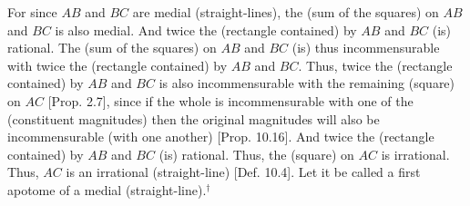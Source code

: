 \begin{Parallel}{}{}
{For since $AB$ and $BC$ are medial (straight-lines), the (sum of the squares)
on $AB$ and $BC$ is also medial. And twice the (rectangle contained)
by $AB$ and $BC$ (is) rational. The (sum of the squares) on $AB$
and $BC$ (is) thus incommensurable with twice the (rectangle contained)
by $AB$ and $BC$. Thus, twice the (rectangle contained) by
$AB$ and $BC$ is also incommensurable with the remaining (square) on $AC$ [Prop. 2.7], since  if the whole is
incommensurable with one of the (constituent magnitudes)   then the original magnitudes will also be incommensurable (with one another) [Prop. 10.16]. And twice the (rectangle
contained) by $AB$ and $BC$ (is) rational. Thus, the (square) on $AC$
is irrational. Thus, $AC$ is an irrational (straight-line) [Def. 10.4]. Let it be called a first apotome
of a medial (straight-line).$^\dag$}
\end{Parallel}


\vspace{7pt}{\footnotesize\noindent $^\dag$ See footnote to Prop.~10.37.} 

